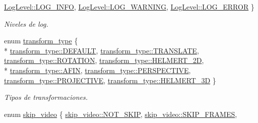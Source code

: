 \begin{DoxyCompactItemize}
\hyperlink{namespace_i3_d_ae1af0f2e3b629610c45222809ff521f6a41abf3cca8cee8cdae01749df7a991c6}{Log\+Level\+::\+L\+O\+G\+\_\+\+I\+N\+FO}, 
\hyperlink{namespace_i3_d_ae1af0f2e3b629610c45222809ff521f6ad0cb3df3102ca9270c5785af9a8c137f}{Log\+Level\+::\+L\+O\+G\+\_\+\+W\+A\+R\+N\+I\+NG}, 
\hyperlink{namespace_i3_d_ae1af0f2e3b629610c45222809ff521f6a4490aa3d29644e716440fada68f54032}{Log\+Level\+::\+L\+O\+G\+\_\+\+E\+R\+R\+OR}
 \}\begin{DoxyCompactList}\small\item\em Niveles de log. \end{DoxyCompactList}
\item 
enum \hyperlink{group__trf_group_ga175e1580b1ecbc0710ad48060d56c2a3}{transform\+\_\+type} \{ \\*
\hyperlink{group__trf_group_gga175e1580b1ecbc0710ad48060d56c2a3a5b39c8b553c821e7cddc6da64b5bd2ee}{transform\+\_\+type\+::\+D\+E\+F\+A\+U\+LT}, 
\hyperlink{group__trf_group_gga175e1580b1ecbc0710ad48060d56c2a3a6ba95f0374a24124cc1632dc38333c82}{transform\+\_\+type\+::\+T\+R\+A\+N\+S\+L\+A\+TE}, 
\hyperlink{group__trf_group_gga175e1580b1ecbc0710ad48060d56c2a3aa27939099e0fe4086159364fcf8d5f73}{transform\+\_\+type\+::\+R\+O\+T\+A\+T\+I\+ON}, 
\hyperlink{group__trf_group_gga175e1580b1ecbc0710ad48060d56c2a3a451b65c237869c22726d0e7cabe674d7}{transform\+\_\+type\+::\+H\+E\+L\+M\+E\+R\+T\+\_\+2D}, 
\\*
\hyperlink{group__trf_group_gga175e1580b1ecbc0710ad48060d56c2a3a11f9aa324c4ce45b5c88e380cccd43dc}{transform\+\_\+type\+::\+A\+F\+IN}, 
\hyperlink{group__trf_group_gga175e1580b1ecbc0710ad48060d56c2a3ad46c97be63d6c4cb887419a4a3df5347}{transform\+\_\+type\+::\+P\+E\+R\+S\+P\+E\+C\+T\+I\+VE}, 
\hyperlink{group__trf_group_gga175e1580b1ecbc0710ad48060d56c2a3a852f7bd2984c084e69c284da9279df7b}{transform\+\_\+type\+::\+P\+R\+O\+J\+E\+C\+T\+I\+VE}, 
\hyperlink{group__trf_group_gga175e1580b1ecbc0710ad48060d56c2a3a984738e72c54b69efbf714641982b3fc}{transform\+\_\+type\+::\+H\+E\+L\+M\+E\+R\+T\+\_\+3D}
 \}\begin{DoxyCompactList}\small\item\em Tipos de transformaciones. \end{DoxyCompactList}
\item 
enum \hyperlink{namespace_i3_d_abddd5dc8b13d45924d75d4dc1d6a0c9e}{skip\+\_\+video} \{ \hyperlink{namespace_i3_d_abddd5dc8b13d45924d75d4dc1d6a0c9eab0263ef12d30ba86202d776352870d44}{skip\+\_\+video\+::\+N\+O\+T\+\_\+\+S\+K\+IP}, 
\hyperlink{namespace_i3_d_abddd5dc8b13d45924d75d4dc1d6a0c9ead6ce96a3966e21e5ba35ca53b3b925d4}{skip\+\_\+video\+::\+S\+K\+I\+P\+\_\+\+F\+R\+A\+M\+ES}, 

\end{DoxyCompactItemize}

